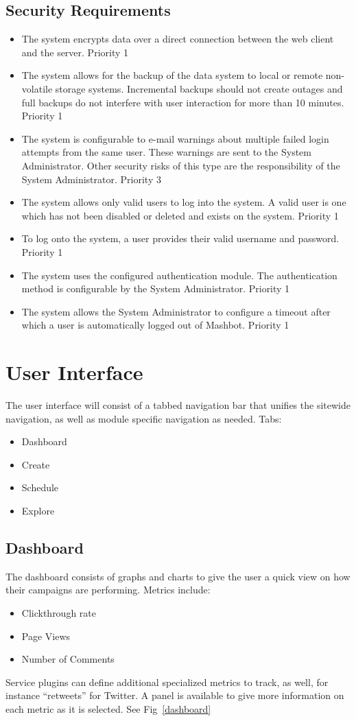 \documentclass{report}
\begin{document}
\subsection{Security Requirements} %
\begin{itemize}
\item The system encrypts data over a direct connection between the
  web client and the server.  Priority 1
\item The system allows for the backup of the data system to local or
  remote non-volatile storage systems.  Incremental backups should not
  create outages and full backups do not interfere with user
  interaction for more than 10 minutes. Priority 1
\item The system is configurable to e-mail warnings about multiple
  failed login attempts from the same user. These warnings are sent to
  the System Administrator. Other security risks of this type are the
  responsibility of the System Administrator. Priority 3
\item The system allows only valid users to log into the system. A
  valid user is one which has not been disabled or deleted and exists
  on the system. Priority 1
\item To log onto the system, a user provides their valid username and
  password. Priority 1
\item The system uses the configured authentication module. The
  authentication method is configurable by the System
  Administrator. Priority 1
\item The system allows the System Administrator to configure a
  timeout after which a user is automatically logged out of
  Mashbot. Priority 1
\end{itemize}

\section{User Interface} %
The user interface will consist of a tabbed navigation bar that
unifies the sitewide navigation, as well as module specific navigation
as needed. Tabs:
\begin{itemize}
\item Dashboard
\item Create
\item Schedule
\item Explore
\end{itemize}
\subsection{Dashboard}
The dashboard consists of graphs and charts to give the user a quick
view on how their campaigns are performing.  Metrics include:
\begin{itemize}
\item Clickthrough rate
\item Page Views
\item Number of Comments
\end{itemize}
Service plugins can define additional specialized metrics to track, as
well, for instance ``retweets'' for Twitter.  A panel is available to
give more information on each metric as it is selected. See Fig~\ref{dashboard}
\end{document}

